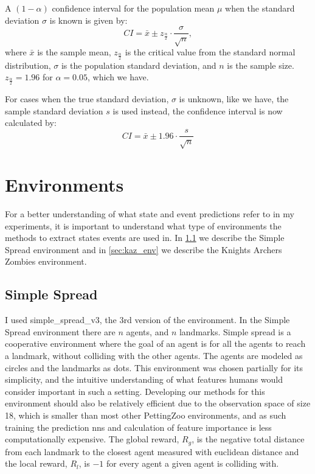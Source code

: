 \documentclass[UKenglish]{uiomasterthesis}
\begin{document}
A $(1-\alpha)$ confidence interval for the population mean \( \mu \) when the standard deviation \( \sigma \) is known is given by:
\[
CI = \bar{x} \pm z_{\frac{\alpha}{2}} \cdot \frac{\sigma}{\sqrt{n}},
\]
where $\bar{x}$ is the sample mean, $z_{\frac{\alpha}{2}}$ is the critical value from the standard normal distribution, $\sigma$ is the population standard deviation, and $n$ is the sample size. $z_{\frac{\alpha}{2}} = 1.96$ for $\alpha = 0.05$, which we have.

For cases when the true standard deviation, $\sigma$ is unknown, like we have, the sample standard deviation $s$ is used instead, the confidence interval is now calculated by:
\[
CI = \bar{x} \pm 1.96 \cdot \frac{s}{\sqrt{n}}
\]


\section{Environments}
\label{sec:env_meth}
For a better understanding of what state and event predictions refer to in my experiments, it is important to understand what type of environments the methods to extract states events are used in. In \cref{sec:simpl_env} we describe the Simple Spread environment and in \cref{sec:kaz_env} we describe the Knights Archers Zombies environment.

\subsection{Simple Spread}
\label{sec:simpl_env}
I used simple\_spread\_v3, the 3rd version of the environment. In the Simple Spread environment there are $n$ agents, and $n$ landmarks. Simple spread is a cooperative environment where the goal of an agent is for all the agents to reach a landmark, without colliding with the other agents. The agents are modeled as circles and the landmarks as dots. This environment was chosen partially for its simplicity, and the intuitive understanding of what features humans would consider important in such a setting. Developing our methods for this environment should also be relatively efficient due to the observation space of size 18, which is smaller than most other PettingZoo environments, and as such training the prediction \acp{nn} and calculation of feature importance is less computationally expensive. The global reward, $R_g$, is the negative total distance from each landmark to the closest agent measured with euclidean distance and the local reward, $R_l$, is $-1$ for every agent a given agent is colliding with.
\end{document}
